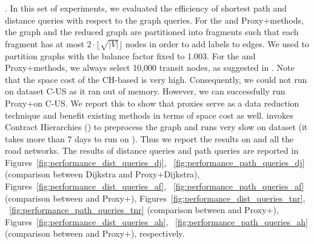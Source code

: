 .
%
In this set of experiments, we evaluated the efficiency of shortest path and distance queries with respect to the graph queries. For the \arcflag and Proxy+\arcflag methods, the graph and the reduced graph are partitioned into fragments such that each fragment has at most $2\cdot \lfloor\sqrt{|V|}\rfloor$ nodes in order to add labels to edges. We used \metis  to partition graphs with the balance factor fixed to 1.003. For the \tnr and Proxy+\tnr methods, we always select 10,000 transit nodes, as suggested in \cite{arz2013transit}. Note that the space cost of the CH-based \tnr is very high. Consequently, we could not run \tnr on dataset C-US as it ran out of memory. However, we can successfully run Proxy+\tnr on C-US. We report this to show that proxies serve as a data reduction technique and benefit existing methods in terms of space cost as well. \tnr invokes Contract Hierarchies (\ch) to preprocess the graph and \ch runs very slow on \dblp dataset (it takes more than 7 days to run \ch on \dblp). Thus we report the results on \dblpone and all the road networks. The results of distance queries and path queries are reported in Figures~\ref{fig:performance_dist_queries_dj}, ~\ref{fig:performance_path_queries_dj} (comparison between Dijkstra and Proxy+Dijkstra), Figures~\ref{fig:performance_dist_queries_af}, ~\ref{fig:performance_path_queries_af} (comparison between \arcflag and Proxy+\arcflag), Figures~\ref{fig:performance_dist_queries_tnr}, ~\ref{fig:performance_path_queries_tnr} (comparison between \tnr and Proxy+\tnr), Figures~\ref{fig:performance_dist_queries_ah}, ~\ref{fig:performance_path_queries_ah} (comparison between \ah and Proxy+\ah), respectively.



